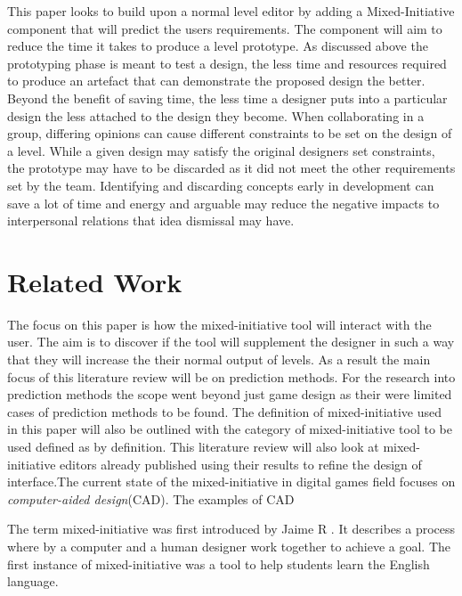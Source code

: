 \documentclass[journal]{IEEEtran}
\begin{document}
This paper looks to build upon  a normal level editor by adding a Mixed-Initiative component that will predict the users requirements. The component will aim to reduce the time it takes to produce a level prototype. As discussed above the prototyping phase is meant to test a design, the less time and resources required to produce an artefact that can demonstrate the proposed design the better. Beyond the benefit of saving time, the less time a designer puts into a particular design the less attached to the design they become. When collaborating in a group, differing opinions can cause different constraints to be set on the design of a level. While a given design may satisfy the original designers set constraints, the prototype may have to be discarded as it did not meet the other requirements set by the team. Identifying and discarding concepts early in development can save a lot of time and energy \cite[p.489]{stempfle1999thinking} and arguable may reduce the negative impacts to interpersonal relations that idea dismissal may have. 

\section{Related Work}
The focus on this paper is how the  mixed-initiative tool will interact with the user. The aim is to discover if the tool will supplement the designer in such a way that they will increase the their normal output of levels. As a result the main focus of this literature review will be on prediction methods. For the research into prediction methods the scope went beyond just game design as their were limited cases of prediction methods to be found. The definition of mixed-initiative used in this paper will also be outlined with the category of mixed-initiative tool to be used defined as by \cite{liapis2016mixed} definition. This literature review will also look at mixed-initiative editors already published using their results to refine the design of interface.The current state of the mixed-initiative in digital games field focuses on \textit{computer-aided design}(CAD). The examples of CAD

The term mixed-initiative was first introduced by Jaime R \cite{carbonell1970mixed}.
It describes a process where by a computer and a human designer work together to achieve a goal. The first instance of mixed-initiative was a tool to help students learn the English language. 
\end{document}
